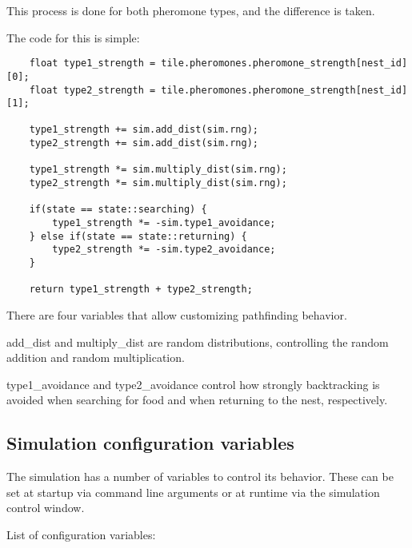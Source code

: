 \documentclass{article}
\begin{document}
This process is done for both pheromone types, and the difference is taken.

The code for this is simple:

\begin{verbatim}
    float type1_strength = tile.pheromones.pheromone_strength[nest_id][0];
    float type2_strength = tile.pheromones.pheromone_strength[nest_id][1];

    type1_strength += sim.add_dist(sim.rng);
    type2_strength += sim.add_dist(sim.rng);

    type1_strength *= sim.multiply_dist(sim.rng);
    type2_strength *= sim.multiply_dist(sim.rng);

    if(state == state::searching) {
        type1_strength *= -sim.type1_avoidance;
    } else if(state == state::returning) {
        type2_strength *= -sim.type2_avoidance;
    }

    return type1_strength + type2_strength;
\end{verbatim}

There are four variables that allow customizing pathfinding behavior.

add\_dist and multiply\_dist are random distributions, controlling the random addition and random multiplication.

type1\_avoidance and type2\_avoidance control how strongly backtracking is avoided when searching for food and when returning to the nest, respectively.


\subsection{Simulation configuration variables}

The simulation has a number of variables to control its behavior.  These can be set at startup via command line arguments or at runtime via the simulation control window.

List of configuration variables:
\end{document}
